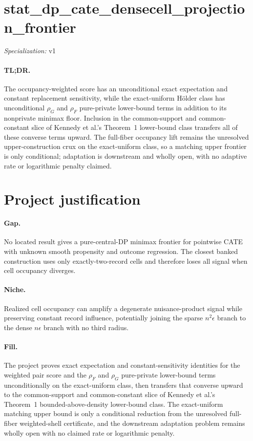 \documentclass{article}
\begin{document}
\sloppy

\section*{stat\_\allowbreak{}dp\_\allowbreak{}cate\_\allowbreak{}densecell\_\allowbreak{}projection\_\allowbreak{}frontier}

\noindent\textit{Specialization:} v1\par

\paragraph{TL;DR.} The occupancy-weighted score has an unconditional exact expectation and constant replacement sensitivity, while the exact-uniform Hölder class has unconditional \(\rho_G\) and \(\rho_F\) pure-private lower-bound terms in addition to its nonprivate minimax floor.  Inclusion in the common-support and common-constant slice of Kennedy et al.'s Theorem~1 lower-bound class transfers all of these converse terms upward.  The full-fiber occupancy lift remains the unresolved upper-construction crux on the exact-uniform class, so a matching upper frontier is only conditional; adaptation is downstream and wholly open, with no adaptive rate or logarithmic penalty claimed.

\section{Project justification}

\paragraph{Gap.} No located result gives a pure-central-DP minimax frontier for pointwise CATE with unknown smooth propensity and outcome regression. The closest banked construction uses only exactly-two-record cells and therefore loses all signal when cell occupancy diverges.

\paragraph{Niche.} Realized cell occupancy can amplify a degenerate nuisance-product signal while preserving constant record influence, potentially joining the sparse \(n^2\epsilon\) branch to the dense \(n\epsilon\) branch with no third radius.

\paragraph{Fill.} The project proves exact expectation and constant-sensitivity identities for the weighted pair score and the \(\rho_F\) and \(\rho_G\) pure-private lower-bound terms unconditionally on the exact-uniform class, then transfers that converse upward to the common-support and common-constant slice of Kennedy et al.'s Theorem~1 bounded-above-density lower-bound class.  The exact-uniform matching upper bound is only a conditional reduction from the unresolved full-fiber weighted-shell certificate, and the downstream adaptation problem remains wholly open with no claimed rate or logarithmic penalty.
\end{document}

